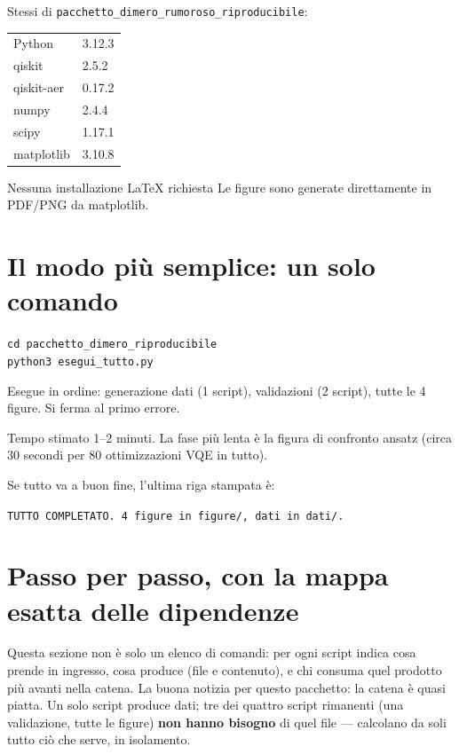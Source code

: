 \documentclass[11pt,a4paper]{article}
\newcommand{\code}[1]{\texttt{\small #1}}
\begin{document}
Stessi di \code{pacchetto\_dimero\_rumoroso\_riproducibile}:

\begin{keyeq}
\centering
\begin{tabular}{@{}ll@{}}
Python & 3.12.3\\
qiskit & 2.5.2\\
qiskit-aer & 0.17.2\\
numpy & 2.4.4\\
scipy & 1.17.1\\
matplotlib & 3.10.8\\
\end{tabular}
\end{keyeq}

\begin{okbox}{Nessuna installazione LaTeX richiesta}
Le figure sono generate direttamente in PDF/PNG da matplotlib.
\end{okbox}

\section{Il modo più semplice: un solo comando}

\begin{keyeq}
\centering
\code{cd pacchetto\_dimero\_riproducibile}\\
\code{python3 esegui\_tutto.py}
\end{keyeq}

Esegue in ordine: generazione dati (1 script), validazioni (2 script),
tutte le 4 figure. Si ferma al primo errore.

\begin{okbox}{Tempo stimato}
1--2 minuti. La fase più lenta è la figura di confronto ansatz (circa
30 secondi per 80 ottimizzazioni VQE in tutto).
\end{okbox}

Se tutto va a buon fine, l'ultima riga stampata è:
\begin{keyeq}
\centering
\code{TUTTO COMPLETATO. 4 figure in figure/, dati in dati/.}
\end{keyeq}

\section{Passo per passo, con la mappa esatta delle dipendenze}

Questa sezione non è solo un elenco di comandi: per ogni script indica
cosa prende in ingresso, cosa produce (file e contenuto), e chi
consuma quel prodotto più avanti nella catena. La buona notizia per
questo pacchetto: la catena è quasi piatta. Un solo script produce
dati; tre dei quattro script rimanenti (una validazione, tutte le
figure) \textbf{non hanno bisogno} di quel file --- calcolano da soli
tutto ciò che serve, in isolamento.
\end{document}
